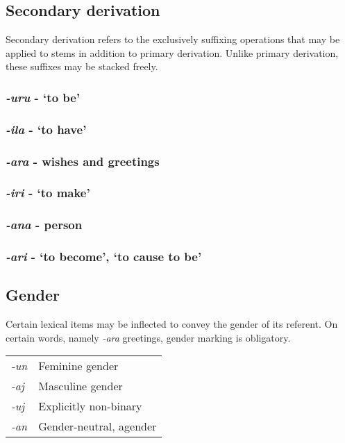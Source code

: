 \documentclass[a4paper,10pt,twoside,openright]{memoir}
\begin{document}
\subsection{Secondary derivation}

Secondary derivation refers to the exclusively suffixing operations that may be applied to stems in addition to primary derivation. Unlike primary derivation, these suffixes may be stacked freely. 

\subsubsection{\emph{-uru} - `to be'}

\subsubsection{\emph{-ila} - `to have'}

\subsubsection{\emph{-ara} - wishes and greetings}

\subsubsection{\emph{-iri} - `to make'}

\subsubsection{\emph{-ana} - person}

\subsubsection{\emph{-ari} - `to become', `to cause to be'}

\subsection{Gender}

Certain lexical items may be inflected to convey the gender of its referent. On certain words, namely \emph{-ara} greetings, gender marking is obligatory.

\begin{table}[ht]
    \centering
    \begin{tabular}{>{\em}ll}
    -un & Feminine gender \\
    -aj & Masculine gender \\
    -uj & Explicitly non-binary \\
    -an & Gender-neutral, agender \\
    \end{tabular}
\end{table}
\end{document}
